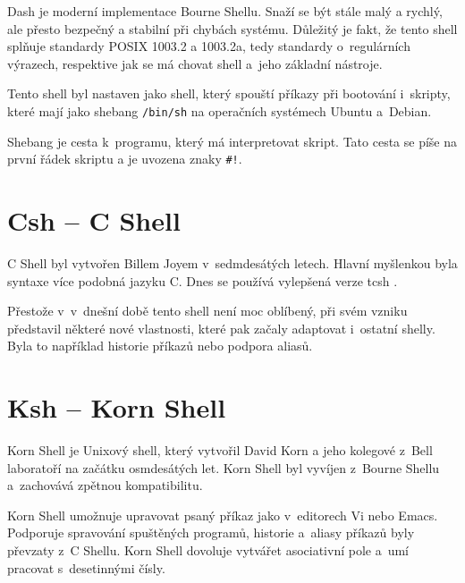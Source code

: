 \documentclass[thesis=M,czech]{FITthesis}[2012/06/26]
\begin{document}
Dash je moderní implementace Bourne Shellu. Snaží se být stále malý a rychlý, ale přesto bezpečný a stabilní při chybách systému. Důležitý je fakt, že tento shell splňuje standardy POSIX 1003.2 a 1003.2a, tedy standardy o~regulárních výrazech, respektive jak se má chovat shell a~jeho základní nástroje.

Tento shell byl nastaven jako shell, který spouští příkazy při bootování i~skripty, které mají jako shebang \texttt{/bin/sh} na operačních systémech Ubuntu a~Debian.

Shebang je cesta k~programu, který má interpretovat skript. Tato cesta se píše na první řádek skriptu a je uvozena znaky \texttt{\#!}.




%
%
%
\section{Csh -- C Shell}

C Shell byl vytvořen Billem Joyem v~sedmdesátých letech. Hlavní myšlenkou byla syntaxe více podobná jazyku C. Dnes se používá vylepšená verze tcsh \cite{tcsh}.

Přestože v~v~dnešní době tento shell není moc oblíbený, při svém vzniku představil některé nové vlastnosti, které pak začaly adaptovat i~ostatní shelly. Byla to například historie příkazů nebo podpora aliasů.




%
%
%
\section{Ksh -- Korn Shell}

Korn Shell \cite{ksh} je Unixový shell, který vytvořil David Korn a jeho kolegové z~Bell laboratoří na začátku osmdesátých let. Korn Shell byl vyvíjen z~Bourne Shellu a~zachovává zpětnou kompatibilitu.

Korn Shell umožnuje upravovat psaný příkaz jako v~editorech Vi nebo Emacs. Podporuje spravování spuštěných programů, historie a~aliasy příkazů byly převzaty z~C Shellu. Korn Shell dovoluje vytvářet asociativní pole a~umí pracovat s~desetinnými čísly.
\end{document}
